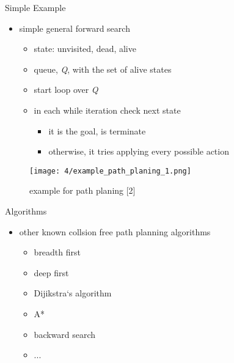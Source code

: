\documentclass[%
  professionalfonts,%
  xcolor={%
    usenames,%
    dvipsnames,%
    svgnames,%
    table,%
    hyperref%
  }%
]{beamer}
\begin{document}
      \begin{frame}{Simple Example}
        \begin{itemize}
          \item simple general forward search
          \begin{itemize}
            \item state: unvisited, dead, alive
            \item queue, \emph{Q}, with the set of alive states
            \item start loop over \emph{Q}
            \item in each while iteration check next state
            \begin{itemize}
              \item it is the goal, is terminate
              \item otherwise, it tries applying every possible action
             \end{itemize} 
          \end{itemize}
        \end{itemize}
        \begin{figure}[h]
          \texttt{[image: 4/example\_path\_planing\_1.png]}
          \caption{example for path planing [2]}
          \label{fig:example path planing 1}
        \end{figure}
      \end{frame}
      
      \begin{frame}{Algorithms}
        \begin{itemize}
          \item other known collsion free path planning algorithms
          \begin{itemize}
            \item breadth first
            \item deep first
            \item Dijikstra‘s algorithm
            \item A*
            \item backward search
            \item ...
          \end{itemize}
        \end{itemize}
      \end{frame}
\end{document}
